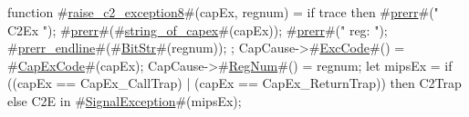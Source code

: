 function #\hyperref[zraisezyc2zyexception8]{raise\_c2\_exception8}#(capEx, regnum) =
  {
    if trace then {
      #\hyperref[zprerr]{prerr}#(" C2Ex ");
      #\hyperref[zprerr]{prerr}#(#\hyperref[zstringzyofzycapex]{string\_of\_capex}#(capEx));
      #\hyperref[zprerr]{prerr}#(" reg: ");
      #\hyperref[zprerrzyendline]{prerr\_endline}#(#\hyperref[zBitStr]{BitStr}#(regnum));
    };
    CapCause->#\hyperref[zExcCode]{ExcCode}#() = #\hyperref[zCapExCode]{CapExCode}#(capEx);
    CapCause->#\hyperref[zRegNum]{RegNum}#()  = regnum;
    let mipsEx = 
      if ((capEx == CapEx_CallTrap) | (capEx == CapEx_ReturnTrap)) 
      then C2Trap else C2E in
    #\hyperref[zSignalException]{SignalException}#(mipsEx);
  }

